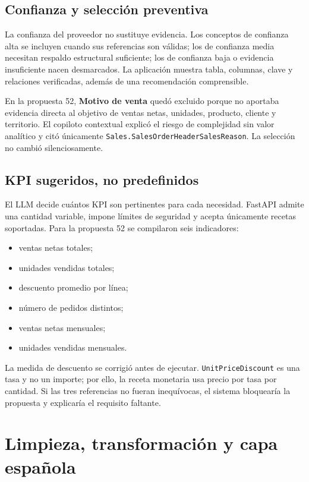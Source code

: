 \documentclass[11pt,letterpaper]{article}
\newcommand{\file}[1]{\texttt{#1}}
\begin{document}
\subsection{Confianza y selección preventiva}

La confianza del proveedor no sustituye evidencia. Los conceptos de confianza alta se incluyen cuando sus referencias son válidas; los de confianza media necesitan respaldo estructural suficiente; los de confianza baja o evidencia insuficiente nacen desmarcados. La aplicación muestra tabla, columnas, clave y relaciones verificadas, además de una recomendación comprensible.

En la propuesta 52, \textbf{Motivo de venta} quedó excluido porque no aportaba evidencia directa al objetivo de ventas netas, unidades, producto, cliente y territorio. El copiloto contextual explicó el riesgo de complejidad sin valor analítico y citó únicamente \file{Sales.SalesOrderHeaderSalesReason}. La selección no cambió silenciosamente.

\subsection{KPI sugeridos, no predefinidos}

El LLM decide cuántos KPI son pertinentes para cada necesidad. FastAPI admite una cantidad variable, impone límites de seguridad y acepta únicamente recetas soportadas. Para la propuesta 52 se compilaron seis indicadores:

\begin{itemize}
  \item ventas netas totales;
  \item unidades vendidas totales;
  \item descuento promedio por línea;
  \item número de pedidos distintos;
  \item ventas netas mensuales;
  \item unidades vendidas mensuales.
\end{itemize}

La medida de descuento se corrigió antes de ejecutar. \file{UnitPriceDiscount} es una tasa y no un importe; por ello, la receta monetaria usa precio por tasa por cantidad. Si las tres referencias no fueran inequívocas, el sistema bloquearía la propuesta y explicaría el requisito faltante.

\section{Limpieza, transformación y capa española}
\end{document}
